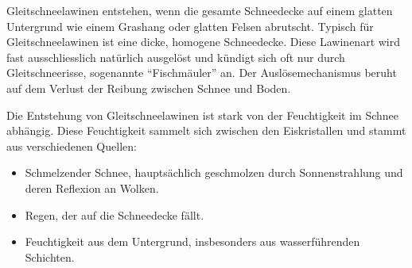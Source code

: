 


Gleitschneelawinen entstehen, wenn die gesamte Schneedecke auf einem glatten Untergrund wie einem Grashang oder glatten Felsen abrutscht. Typisch für Gleitschneelawinen ist eine dicke, homogene Schneedecke. Diese Lawinenart wird fast ausschliesslich natürlich ausgelöst und kündigt sich oft nur durch Gleitschneerisse, sogenannte “Fischmäuler” an. Der Auslösemechanismus beruht auf dem Verlust der Reibung zwischen Schnee und Boden. \cite{Mitterer.2024}

Die Entstehung von Gleitschneelawinen ist stark von der Feuchtigkeit im Schnee abhängig. Diese Feuchtigkeit sammelt sich zwischen den Eiskristallen und stammt aus verschiedenen Quellen:

\begin{itemize}
    \item Schmelzender Schnee, hauptsächlich geschmolzen durch Sonnenstrahlung und deren Reflexion an Wolken.
    \item Regen, der auf die Schneedecke fällt.
    \item Feuchtigkeit aus dem Untergrund, insbesonders aus wasserführenden Schichten.

\end{itemize}

